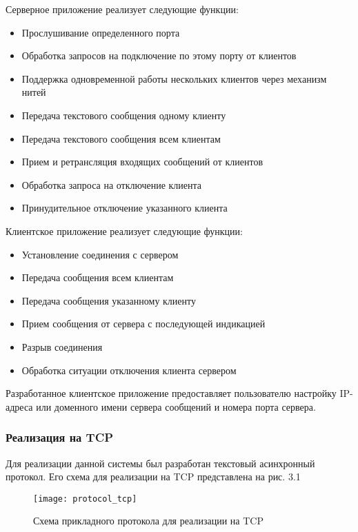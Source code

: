 Серверное приложение реализует следующие функции:
\begin{itemize}
\item Прослушивание определенного порта
\item Обработка запросов на подключение по этому порту от клиентов
\item Поддержка одновременной работы нескольких клиентов через механизм нитей
\item Передача текстового сообщения одному клиенту
\item Передача текстового сообщения всем клиентам
\item Прием и ретрансляция входящих сообщений от клиентов
\item Обработка запроса на отключение клиента
\item Принудительное отключение указанного клиента
\end{itemize}

Клиентское приложение реализует следующие функции:

\begin{itemize}
\item Установление соединения с сервером
\item Передача сообщения всем клиентам
\item Передача сообщения указанному клиенту
\item Прием сообщения от сервера с последующей индикацией
\item Разрыв соединения
\item Обработка ситуации отключения клиента сервером
\end{itemize}

Разработанное клиентское приложение предоставляет пользователю настройку IP-адреса или доменного имени сервера сообщений и номера порта сервера.

\subsubsection{Реализация на TCP}

Для реализации данной системы был разработан текстовый асинхронный протокол. Его схема для реализации на TCP представлена на рис. 3.1

\begin{figure}[H]
	\begin{center}
		\texttt{[image: protocol\_tcp]}
		\caption{Схема прикладного протокола для реализации на TCP} 
		\label{pic:pic_name} %
	\end{center}
\end{figure}

